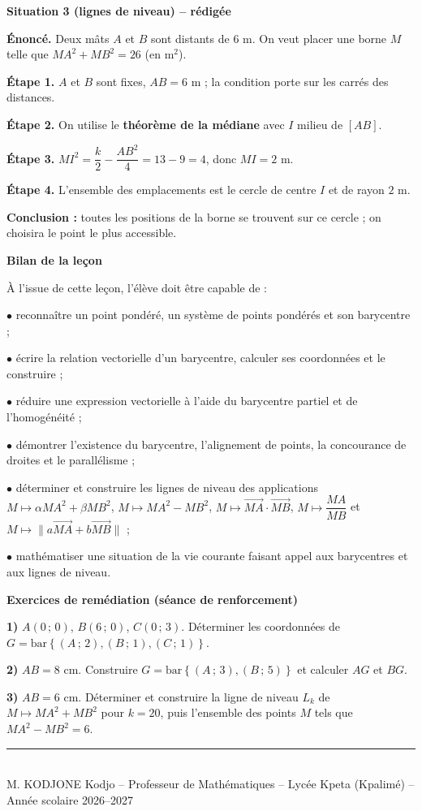 \documentclass[10pt,a4paper]{article}
\newcommand{\vc}[1]{\overrightarrow{#1}}                     %
\newcommand{\barG}[1]{\mathrm{bar}\left\{#1\right\}}          %
\newenvironment{encadre}[3][10]{%
  \par\needspace{#1\baselineskip}\addvspace{6pt}\noindent
  \def\encColor{#2}%
  \begin{lrbox}{\encbox}%
  \begin{minipage}{\dimexpr\linewidth-2\fboxsep-2\fboxrule-0.5pt\relax}%
  \raggedright{\color{#2}\bfseries #3}\par\smallskip}%
  {\end{minipage}\end{lrbox}%
  \noindent\fcolorbox{\encColor}{\encColor!7}{\usebox{\encbox}}\par\addvspace{6pt}}
\begin{document}
\begin{encadre}[20]{cEx}{Situation 3 (lignes de niveau) -- rédigée}
\textbf{Énoncé.} Deux mâts $A$ et $B$ sont distants de $6$ m. On veut placer une borne $M$ telle que $MA^2+MB^2=26$ (en m$^2$).\par
\textbf{Étape 1.} $A$ et $B$ sont fixes, $AB=6$ m ; la condition porte sur les carrés des distances.\par
\textbf{Étape 2.} On utilise le \textbf{théorème de la médiane} avec $I$ milieu de $[AB]$.\par
\textbf{Étape 3.} $MI^2=\dfrac{k}{2}-\dfrac{AB^2}{4}=13-9=4$, donc $MI=2$ m.\par
\textbf{Étape 4.} L'ensemble des emplacements est le cercle de centre $I$ et de rayon $2$ m.\par
\textbf{Conclusion :} toutes les positions de la borne se trouvent sur ce cercle ; on choisira le point le plus accessible.
\end{encadre}

\begin{encadre}[16]{cProp}{Bilan de la leçon}
À l'issue de cette leçon, l'élève doit être capable de :\par
$\bullet$ reconnaître un point pondéré, un système de points pondérés et son barycentre ;\par
$\bullet$ écrire la relation vectorielle d'un barycentre, calculer ses coordonnées et le construire ;\par
$\bullet$ réduire une expression vectorielle à l'aide du barycentre partiel et de l'homogénéité ;\par
$\bullet$ démontrer l'existence du barycentre, l'alignement de points, la concourance de droites et le parallélisme ;\par
$\bullet$ déterminer et construire les lignes de niveau des applications $M\mapsto \alpha MA^2+\beta MB^2$, $M\mapsto MA^2-MB^2$, $M\mapsto \vc{MA}\cdot\vc{MB}$, $M\mapsto \dfrac{MA}{MB}$ et $M\mapsto \lVert a\vc{MA}+b\vc{MB}\rVert$ ;\par
$\bullet$ mathématiser une situation de la vie courante faisant appel aux barycentres et aux lignes de niveau.
\end{encadre}

\begin{encadre}[14]{cApp}{Exercices de remédiation (séance de renforcement)}
\textbf{1)} $A(0\,;\,0)$, $B(6\,;\,0)$, $C(0\,;\,3)$. Déterminer les coordonnées de $G=\barG{(A\,;\,2),(B\,;\,1),(C\,;\,1)}$.\par
\textbf{2)} $AB=8$ cm. Construire $G=\barG{(A\,;\,3),(B\,;\,5)}$ et calculer $AG$ et $BG$.\par
\textbf{3)} $AB=6$ cm. Déterminer et construire la ligne de niveau $L_k$ de $M\mapsto MA^2+MB^2$ pour $k=20$, puis l'ensemble des points $M$ tels que $MA^2-MB^2=6$.
\end{encadre}

\vspace{6pt}
\begin{center}
{\color{cProp}\rule{0.5\linewidth}{0.8pt}}\\[3pt]
{\footnotesize\color{cGris}M. KODJONE Kodjo -- Professeur de Mathématiques -- Lycée Kpeta (Kpalimé) -- Année scolaire 2026--2027}
\end{center}
\end{document}
